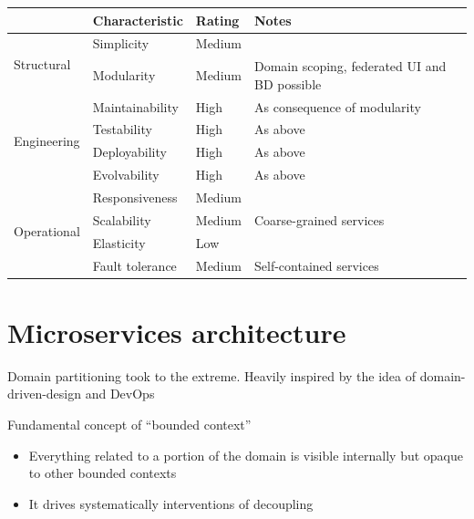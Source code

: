 \begin{table}[h!]
  \renewcommand{\arraystretch}{1.4}
  \centering
  \begin{tabular}{l l l l}
    \toprule
     & \textbf{Characteristic} & \textbf{Rating} & \textbf{Notes}                               \\
    \midrule
    \multirow{2}{*}{Structural}
     & Simplicity              & Medium          &                                              \\
     & Modularity              & Medium          & Domain scoping, federated UI and BD possible \\
    \midrule
    \multirow{4}{*}{Engineering}
     & Maintainability         & High            & As consequence of modularity                 \\
     & Testability             & High            & As above                                     \\
     & Deployability           & High            & As above                                     \\
     & Evolvability            & High            & As above                                     \\
    \midrule
    \multirow{4}{*}{Operational}
     & Responsiveness          & Medium          &                                              \\
     & Scalability             & Medium          & Coarse-grained services                      \\
     & Elasticity              & Low             &                                              \\
     & Fault tolerance         & Medium          & Self-contained services                      \\
    \bottomrule
  \end{tabular}
\end{table}

\section{Microservices architecture}

Domain partitioning took to the extreme.
Heavily inspired by the idea of domain-driven-design and DevOps


Fundamental concept of ``bounded context''

\begin{itemize}
  \item Everything related to a portion of the domain is visible internally but
        opaque to other bounded contexts
  \item It drives systematically interventions of decoupling
\end{itemize}

